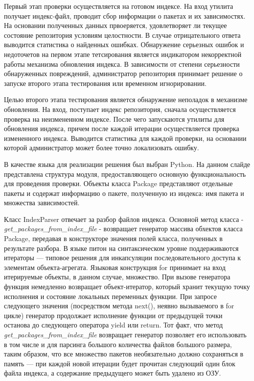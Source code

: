 \documentclass[a4paper]{article}
\begin{document}
Первый этап проверки осуществляется на готовом индексе. На вход утилита получает индекс-файл, проводит сбор информации о пакетах и
их зависимостях. На основании полученных данных првоеряется, удовлетворяет ли текущее состояние репозитория условиям целостности.
В случае отрицательного ответа выводится статистика о найденных ошибках. Обнаружение серьезных ошибок и недоточетов на первом этапе тетсирования является индикатором некорректной работы механизма обновления индекса. В зависимости от степени серьезности обнаруженных
повреждений, администратор репозитория принимает решение о запуске второго этапа тестирования или временном игнорировании.

Целью второго этапа тестирования является обнаружение неполадок в механизме обновления. На вход, поступает индекс репозитория, сначала осуществляется проверка на неизмененном индексе. После чего запускаются
утилиты для обновления индекса, причем после каждой итерации осуществляется проверка измененного индекса. Выводится статистика для каждой проверки, на основании которой администратор может более точно локализовать ошибку.

В качестве языка для реализации решения был выбран Python. На данном слайде представлена структура модуля, предоставляющего основную функциональность для проведения проверки.
Объекты класса Package представляют отдельные пакеты и содержат информацию о пакете, полученную из индекса: имя пакета и множества зависимостей.

Класс IndexParser отвечает за разбор файлов индекса. Основной метод класса - \textit{get\_packages\_from\_index\_file} - возвращает генератор массива обхектов класса Package, передавая в конструкторе значения полей класса, полученных в результате разбора. В языке питон на синтаксическом уровне поддерживаются итераторы ---
типовое решения для инкапсуляции последовательного доступа к элементам объекта-агрегата.
Языковая конструкция for принимает на вход итерируемые объекты, в данном случае, множество.
При вызове генератора функция немедленно возвращает объект-итератор, 
который хранит текущую точку исполнения и состояние локальных переменных функции. 
При запросе следующего значения (посредством метода next(), неявно вызываемого в for цикле) 
генератор продолжает исполнение функции от предыдущей точки останова до следующего оператора yield или return.
Тот факт, что метод \textit{get\_packages\_from\_index\_file} возвращает генератор позволяет
его использовать в том числе и для парсинга большого количества файлов большого размера, 
таким образом, что все множество пакетов необязательно должно сохраняться в память ---
при каждой новой итерации будет прочитан следующий один блок файла индекса, 
а содержание предыдущего может быть удалено из ОЗУ.
\end{document}
